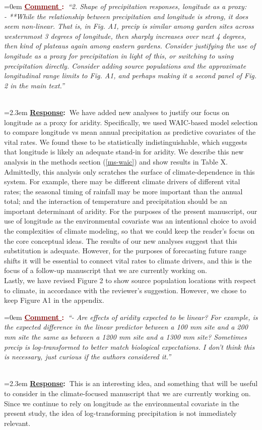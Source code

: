 \documentclass[12pt]{article}
\newcounter{cN}
\newcommand{\comment}[1]{
	\vspace{2em}
	\refstepcounter{cN} %
	\noindent \hangindent=0em \textbf{\textcolor{Maroon}{\uline{Comment \thecN}:~}}\emph{``#1''}
	}
\newcommand{\response}[1]{
	\\[0.25em]
	\hangindent=2.3em \textbf{\textcolor{NavyBlue}{\uline{Response}:~}}#1
	}
\begin{document}
\comment{2. Shape of precipitation responses, longitude as a proxy:
	\\
	- **While the relationship between precipitation and longitude is strong, it does seem non-linear. That is, in Fig. A1, precip is similar among garden sites across westernmost 3 degrees of longitude, then sharply increases over next 4 degrees, then kind of plateaus again among eastern gardens. Consider justifying the use of longitude as a proxy for precipitation in light of this, or switching to using precipitation directly. Consider adding source populations and the approximate longitudinal range limits to Fig. A1, and perhaps making it a second panel of Fig. 2 in the main text.}
\response{We have added new analyses to justify our focus on longitude as a proxy for aridity. Specifically, we used WAIC-based model selection to compare longitude vs mean annual precipitation as predictive covariates of the vital rates. We found these to be statistically indistinguishable, which suggests that longitude is likely an adequate stand-in for aridity. We describe this new analysis in the methods section (\ref{ms-waic}) and show results in Table X.
\\
Admittedly, this analysis only scratches the surface of climate-dependence in this system. For example, there may be different climate drivers of different vital rates; the seasonal timing of rainfall may be more important than the annual total; and the interaction of temperature and precipitation should be an important determinant of aridity. For the purposes of the present manuscript, our use of longitude as the environmental covariate was an intentional choice to avoid the complexities of climate modeling, so that we could keep the reader's focus on the core conceptual ideas. The results of our new analyses suggest that this substitution is adequate. However, for the purposes of forecasting future range shifts it will be essential to connect vital rates to climate drivers, and this is the focus of a follow-up manuscript that we are currently working on.
\\
Lastly, we have revised Figure 2 to show source population locations with respect to climate, in accordance with the reviewer's suggestion. However, we chose to keep Figure A1 in the appendix.}

\comment{- Are effects of aridity expected to be linear? For example, is the expected difference in the linear predictor between a 100 mm site and a 200 mm site the same as between a 1200 mm site and a 1300 mm site? Sometimes precip is log-transformed to better match biological expectations. I don't think this is necessary, just curious if the authors considered it.}
\response{This is an interesting idea, and something that will be useful to consider in the climate-focused manuscript that we are currently working on. Since we continue to rely on longitude as the environmental covariate in the present study, the idea of log-transforming precipitation is not immediately relevant.}
\end{document}
